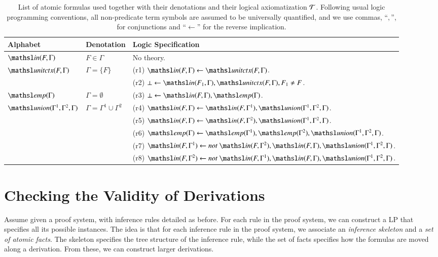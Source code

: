 \documentclass{new_tlp}
\newcommand\dnot{\ensuremath{\mathit{not}}\xspace}
\newcommand{\elin}[2]{\ensuremath{{\tsl{unitctx}(\ensuremath{#1}, \ensuremath{#2})}}}
\newcommand{\emp}[1]{\ensuremath{{\tsl{emp}(\ensuremath{#1})}}}
\newcommand{\union}[3]{\ensuremath{{\tsl{union}(\ensuremath{#1},\ensuremath{#2},\ensuremath{ #3})}}}
\newcommand{\In}[2]{\ensuremath{\tsl{in}(\ensuremath{#1},\ensuremath{#2})}}
\begin{document}
\newcommand\xor{\veebar}
\newcommand\thSeq{\ensuremath{\Tscr}}
\newcommand\groundSet{\ensuremath{\mathcal{B}}}
\begin{table}[t]
\caption{\small List of atomic formulas used together
with their denotations and their logical axiomatization $\thSeq$. Following 
usual logic programming conventions, all non-predicate term symbols are assumed 
to be universally quantified, and we use commas, ``$,$'', for conjunctions and
 ``$\leftarrow$'' for the reverse implication.}
\label{fig:predicates}
\begin{tabular}{l@{\quad}p{2cm}@{\quad}l}
\toprule
Alphabet & Denotation & Logic Specification \\[1pt]
\midrule
$\In{F}{\Gamma}$ & $F \in \Gamma$ & No theory.\\
\midrule
$\elin{F}{\Gamma}$ &  $\Gamma = \{F\}$ & (r1) $\In{F}{\Gamma} \leftarrow \elin{F}{\Gamma}$. \\[1pt]
&& (r2) $\bot \leftarrow \In{F_1}{\Gamma}, \elin{F}{\Gamma}, F_1 \neq F$. \\
\midrule
$\emp{\Gamma}$ & $\Gamma = \emptyset$ 
&  (r3) $\bot \leftarrow \In{F}{\Gamma}, \emp{\Gamma}$. \\
\midrule
$\union{\Gamma^1} {\Gamma^2} {\Gamma}$ & $\Gamma = \Gamma^1 \cup \Gamma^2$ & 
   (r4) $\In{F}{\Gamma} \leftarrow \In{F}{\Gamma^1}, \union{\Gamma^1}{\Gamma^2}{\Gamma}$. \\[1pt]
&& (r5) $\In{F}{\Gamma} \leftarrow \In{F}{\Gamma^2}, \union{\Gamma^1}{\Gamma^2}{\Gamma}$. \\[1pt]
&& (r6) $\emp{\Gamma}  \leftarrow \emp{\Gamma^1},\emp{\Gamma^2}, \union{\Gamma^1}{\Gamma^2}{\Gamma}$. \\[1pt]
&& (r7) $\In{F}{\Gamma^1}  \leftarrow \dnot\ \In{F}{\Gamma^2}, \In{F}{\Gamma}, \union{\Gamma^1}{\Gamma^2}{\Gamma}$. \\
&& (r8) $\In{F}{\Gamma^2}  \leftarrow \dnot\ \In{F}{\Gamma^1}, \In{F}{\Gamma}, \union{\Gamma^1}{\Gamma^2}{\Gamma}$. \\
\bottomrule
\end{tabular}
\vspace{-4mm}
\end{table}

\vspace{-2mm}
\section{Checking the Validity of Derivations}
\label{sec:derivations} 

Assume given a proof system, with inference rules detailed as before. 
For each rule in the proof system, we can construct a LP that specifies all 
its possible instances. The idea is that for each inference rule in the proof system, 
we associate an \emph{inference skeleton} and a \emph{set of atomic facts}. 
The skeleton specifies the tree structure of the inference rule, while the set of 
facts specifies how the formulas are moved along a derivation. 
From these, we can construct larger derivations.
\end{document}
